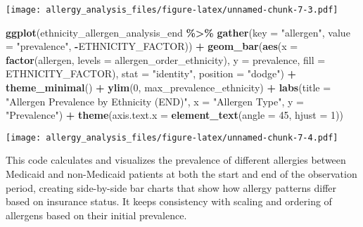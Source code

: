 \documentclass[
]{article}
\newenvironment{Shaded}{\begin{snugshade}}{\end{snugshade}}
\newcommand{\AttributeTok}[1]{\textcolor[rgb]{0.13,0.29,0.53}{#1}}
\newcommand{\DecValTok}[1]{\textcolor[rgb]{0.00,0.00,0.81}{#1}}
\newcommand{\FunctionTok}[1]{\textcolor[rgb]{0.13,0.29,0.53}{\textbf{#1}}}
\newcommand{\NormalTok}[1]{#1}
\newcommand{\SpecialCharTok}[1]{\textcolor[rgb]{0.81,0.36,0.00}{\textbf{#1}}}
\newcommand{\StringTok}[1]{\textcolor[rgb]{0.31,0.60,0.02}{#1}}
\begin{document}
\texttt{[image: allergy\_analysis\_files/figure-latex/unnamed-chunk-7-3.pdf]}

\begin{Shaded}
\begin{Highlighting}[]
\FunctionTok{ggplot}\NormalTok{(ethnicity\_allergen\_analysis\_end }\SpecialCharTok{\%\textgreater{}\%} 
       \FunctionTok{gather}\NormalTok{(}\AttributeTok{key =} \StringTok{"allergen"}\NormalTok{, }\AttributeTok{value =} \StringTok{"prevalence"}\NormalTok{, }\SpecialCharTok{{-}}\NormalTok{ETHNICITY\_FACTOR)) }\SpecialCharTok{+}
  \FunctionTok{geom\_bar}\NormalTok{(}\FunctionTok{aes}\NormalTok{(}\AttributeTok{x =} \FunctionTok{factor}\NormalTok{(allergen, }\AttributeTok{levels =}\NormalTok{ allergen\_order\_ethnicity), }
               \AttributeTok{y =}\NormalTok{ prevalence, }\AttributeTok{fill =}\NormalTok{ ETHNICITY\_FACTOR), }
           \AttributeTok{stat =} \StringTok{"identity"}\NormalTok{, }\AttributeTok{position =} \StringTok{"dodge"}\NormalTok{) }\SpecialCharTok{+}
  \FunctionTok{theme\_minimal}\NormalTok{() }\SpecialCharTok{+}
  \FunctionTok{ylim}\NormalTok{(}\DecValTok{0}\NormalTok{, max\_prevalence\_ethnicity) }\SpecialCharTok{+}
  \FunctionTok{labs}\NormalTok{(}\AttributeTok{title =} \StringTok{"Allergen Prevalence by Ethnicity (END)"}\NormalTok{,}
       \AttributeTok{x =} \StringTok{"Allergen Type"}\NormalTok{,}
       \AttributeTok{y =} \StringTok{"Prevalence"}\NormalTok{) }\SpecialCharTok{+}
  \FunctionTok{theme}\NormalTok{(}\AttributeTok{axis.text.x =} \FunctionTok{element\_text}\NormalTok{(}\AttributeTok{angle =} \DecValTok{45}\NormalTok{, }\AttributeTok{hjust =} \DecValTok{1}\NormalTok{))}
\end{Highlighting}
\end{Shaded}

\texttt{[image: allergy\_analysis\_files/figure-latex/unnamed-chunk-7-4.pdf]}

This code calculates and visualizes the prevalence of different
allergies between Medicaid and non-Medicaid patients at both the start
and end of the observation period, creating side-by-side bar charts that
show how allergy patterns differ based on insurance status. It keeps
consistency with scaling and ordering of allergens based on their
initial prevalence.
\end{document}
